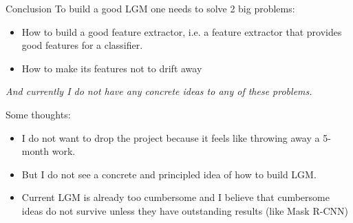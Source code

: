 \documentclass[10pt]{beamer}
\begin{document}
\begin{frame}{Conclusion}
    To build a good LGM one needs to solve 2 big problems:
    \begin{itemize}
        \item How to build a good feature extractor, i.e. a feature extractor that provides good features for a classifier.
        \item How to make its features not to drift away
    \end{itemize}
    
    \textit{And currently I do not have any concrete ideas to any of these problems.}
    
    \vspace{1em}
    
    Some thoughts:
    \begin{itemize}
        \item I do not want to drop the project because it feels like throwing away a 5-month work.
        \item But I do not see a concrete and principled idea of how to build LGM.
        \item Current LGM is already too cumbersome and I believe that cumbersome ideas do not survive unless they have outstanding results (like Mask R-CNN)
    \end{itemize}
\end{frame}
\end{document}
